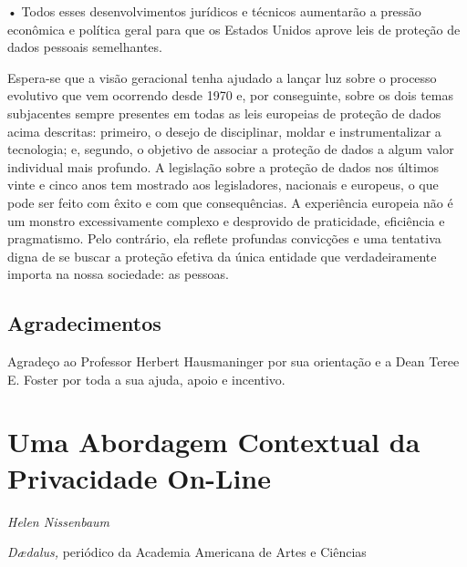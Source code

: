 • Todos esses desenvolvimentos jurídicos e técnicos aumentarão a pressão
econômica e política geral para que os Estados Unidos aprove leis de
proteção de dados pessoais semelhantes.

Espera-se que a visão geracional tenha ajudado a lançar luz sobre o
processo evolutivo que vem ocorrendo desde 1970 e, por conseguinte,
sobre os dois temas subjacentes sempre presentes em todas as leis
europeias de proteção de dados acima descritas: primeiro, o desejo de
disciplinar, moldar e instrumentalizar a tecnologia; e, segundo, o
objetivo de associar a proteção de dados a algum valor individual mais
profundo. A legislação sobre a proteção de dados nos últimos vinte e
cinco anos tem mostrado aos legisladores, nacionais e europeus, o que
pode ser feito com êxito e com que consequências. A experiência europeia
não é um monstro excessivamente complexo e desprovido de praticidade,
eficiência e pragmatismo. Pelo contrário, ela reflete profundas
convicções e uma tentativa digna de se buscar a proteção efetiva da
única entidade que verdadeiramente importa na nossa sociedade: as
pessoas.

\section{Agradecimentos}

Agradeço ao Professor Herbert Hausmaninger por sua orientação e a Dean
Teree E. Foster por toda a sua ajuda, apoio e incentivo.

\chapter{Uma Abordagem Contextual da Privacidade
On-Line}\label{uma-abordagem-contextual-da-privacidade-on-line}

\begin{flushright}
\emph{Helen Nissenbaum}
\end{flushright}

\emph{Dædalus,} periódico da Academia Americana de Artes e Ciências

